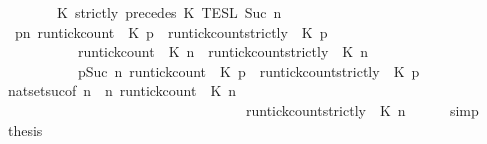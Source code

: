 \begin{isabellebody}
\ \ \ \ \ \ {\isasyminter}\ {\isasymlbrakk}\ K\ strictly\ precedes\ K\ {\isasymrbrakk}\isactrlsub T\isactrlsub E\isactrlsub S\isactrlsub L\isactrlbsup {\isasymge}\ Suc\ n\isactrlesup {\isacartoucheclose}\isanewline
%
\isadelimproof
%
\endisadelimproof
%
\isatagproof
{}\isamarkupfalse%
\ {\isacharminus}\isanewline
\ \ \isamarkupfalse%
\ {\isacartoucheopen}{\isacharbraceleft}{\isasymrho}{\isachardot}\ {\isasymforall}p{\isasymge}n{\isachardot}\ {\isacharparenleft}run{\isacharunderscore}tick{\isacharunderscore}count\ {\isasymrho}\ K\ p{\isacharparenright}\ {\isasymle}\ {\isacharparenleft}run{\isacharunderscore}tick{\isacharunderscore}count{\isacharunderscore}strictly\ {\isasymrho}\ K\ p{\isacharparenright}{\isacharbraceright}\isanewline
\ \ \ \ \ \ \ \ \ {\isacharequal}\ {\isacharbraceleft}{\isasymrho}{\isachardot}\ {\isacharparenleft}run{\isacharunderscore}tick{\isacharunderscore}count\ {\isasymrho}\ K\ n{\isacharparenright}\ {\isasymle}\ {\isacharparenleft}run{\isacharunderscore}tick{\isacharunderscore}count{\isacharunderscore}strictly\ {\isasymrho}\ K\ n{\isacharparenright}{\isacharbraceright}\isanewline
\ \ \ \ \ \ \ \ \ {\isasyminter}\ {\isacharbraceleft}{\isasymrho}{\isachardot}\ {\isasymforall}p{\isasymge}Suc\ n{\isachardot}\ {\isacharparenleft}run{\isacharunderscore}tick{\isacharunderscore}count\ {\isasymrho}\ K\ p{\isacharparenright}\ {\isasymle}\ {\isacharparenleft}run{\isacharunderscore}tick{\isacharunderscore}count{\isacharunderscore}strictly\ {\isasymrho}\ K\ p{\isacharparenright}{\isacharbraceright}{\isacartoucheclose}\isanewline
\ \ \ \ \isamarkupfalse%
\ nat{\isacharunderscore}set{\isacharunderscore}suc{\isacharbrackleft}of\ {\isacartoucheopen}n{\isacartoucheclose}\ {\isacartoucheopen}{\isasymlambda}{\isasymrho}\ n{\isachardot}\ {\isacharparenleft}run{\isacharunderscore}tick{\isacharunderscore}count\ {\isasymrho}\ K\ n{\isacharparenright}\isanewline
\ \ \ \ \ \ \ \ \ \ \ \ \ \ \ \ \ \ \ \ \ \ \ \ \ \ \ \ \ \ \ \ \ \ {\isasymle}\ {\isacharparenleft}run{\isacharunderscore}tick{\isacharunderscore}count{\isacharunderscore}strictly\ {\isasymrho}\ K\ n{\isacharparenright}{\isacartoucheclose}{\isacharbrackright}\isanewline
\ \ \ \ \isamarkupfalse%
\ simp\isanewline
\ \ \isamarkupfalse%
\ {\isacharquery}thesis\ \isamarkupfalse%

\end{isabellebody}
